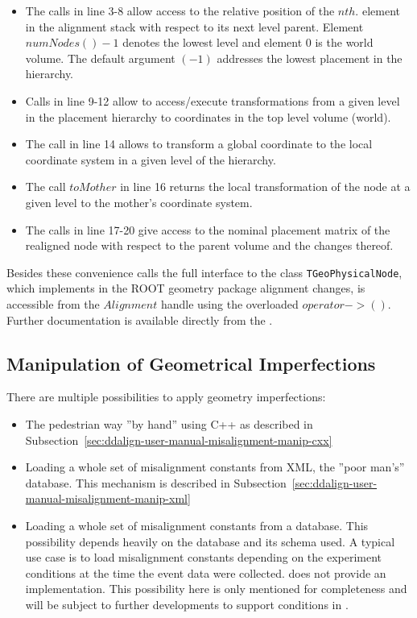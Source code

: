 \documentclass[10pt,a4paper]{article}
\begin{document}
\begin{itemize}\itemcompact
\item The calls in line 3-8 allow access to the relative position of the $nth.$ element
    in the alignment stack with respect to its next level parent. 
    Element $numNodes()-1$ denotes the lowest level and element $0$ is the world 
    volume. The default argument $(-1)$ addresses the lowest placement in the hierarchy.
\item Calls in line 9-12 allow to access/execute transformations from a given level
    in the placement hierarchy to coordinates in the top level volume (world).
\item The call in line 14 allows to transform a global coordinate to the local coordinate
    system in a given level of the hierarchy.
\item The call $toMother$ in line 16 returns the local transformation of the node at
    a given level to the mother's coordinate system.
\item The calls in line 17-20 give access to the nominal placement matrix of the realigned
    node with respect to the parent volume and the changes thereof.
\end{itemize}
Besides these convenience calls the full interface to the class {\tt TGeoPhysicalNode}, 
which implements in the ROOT geometry package alignment changes, is accessible 
from the $Alignment$ handle using the overloaded $operator->()$.
Further documentation is available directly from the .

\noindent
\subsection{Manipulation of Geometrical Imperfections}
\label{sec:ddalign-user-manual-misalignment-manip}
There are multiple possibilities to apply geometry imperfections:
\begin{itemize}\itemcompact
\item The pedestrian way ''by hand'' using C++ as described in 
    Subsection~\ref{sec:ddalign-user-manual-misalignment-manip-cxx}
\item Loading a whole set of misalignment constants from XML, the ''poor man's'' database.
    This mechanism is described in
    Subsection~\ref{sec:ddalign-user-manual-misalignment-manip-xml}
\item Loading a whole set of misalignment constants from a database.
    This possibility depends heavily on the database and its schema used.
    A typical use case is to load misalignment constants depending on the
    experiment conditions at the time the event data were collected.
    \DDA does not provide an implementation.
    This possibility here is only mentioned for completeness and will be subject 
    to further developments to support conditions in \DDhep. 
\end{itemize}
\end{document}
